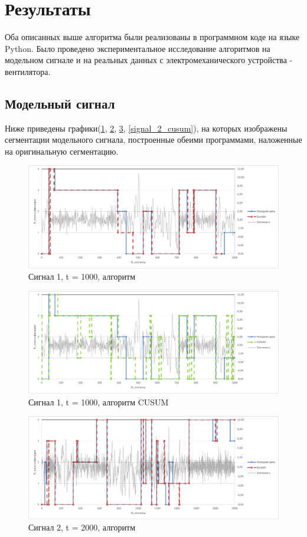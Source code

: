 \documentclass[12pt,a4paper]{article}
\begin{document}
\section{Результаты}
Оба описанных выше алгоритма были реализованы в программном коде на языке Python. Было проведено экспериментальное исследование алгоритмов на модельном сигнале и на реальных данных с электромеханического устройства - вентилятора.
\subsection{Модельный сигнал}
Ниже приведены графики(\ref{signal_1_burobin}, \ref{signal_1_cusum}, \ref{signal_2_burobin}, \ref{signal_2_cusum}), на которых изображены сегментации модельного сигнала, построенные обеими программами, наложенные на оригинальную сегментацию.\\
\begin{figure}[h]
\includegraphics[width=\linewidth]{1k_burobin}
\caption{Сигнал 1, t = 1000, алгоритм\cite{burobin}}
\label{signal_1_burobin}
\end{figure}
\begin{figure}[h]
\includegraphics[width=\linewidth]{1k_cusum}
\caption{Сигнал 1, t = 1000, алгоритм CUSUM}
\label{signal_1_cusum}
\end{figure}
\begin{figure}[h]
\includegraphics[width=\linewidth]{2k_burobin}
\caption{Сигнал 2, t = 2000, алгоритм\cite{burobin}}
\label{signal_2_burobin}
\end{figure}
\end{document}

